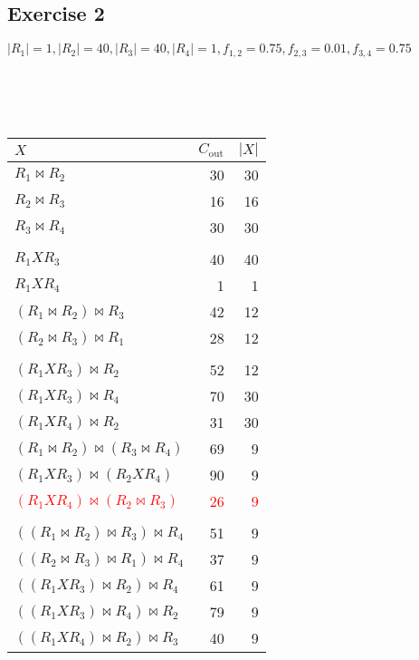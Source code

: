 \documentclass[11pt, a4]{article}
\begin{document}
\subsection*{Exercise 2}
$|R_1| = 1, |R_2| = 40, |R_3| = 40, |R_4| = 1, f_{1,2} = 0.75, f_{2,3} = 0.01, f_{3,4} = 0.75$\\
\vspace{.2cm}\\
\\
\vspace{.2cm}\\
\begin{tabular}{l|r|r}
    $X$ & $C_{\text{out}}$ & $|X|$\\
    \hline
    $R_1 \bowtie R_2$ & 30 & 30\\
    $R_2 \bowtie R_3$ & 16 & 16\\
    $R_3 \bowtie R_4$ & 30 & 30\\
    &&\\
    $R_1 X R_3$ & 40 & 40\\
    $R_1 X R_4$ & 1 & 1\\
    \hline
    $(R_1 \bowtie R_2)\bowtie R_3$ & 42 & 12\\
    $(R_2\bowtie R_3) \bowtie R_1$ & 28 & 12\\
    &&\\
    $(R_1 X R_3)\bowtie R_2$ & 52 & 12\\
    $(R_1 X R_3)\bowtie R_4$ & 70 & 30\\
    $(R_1 X R_4)\bowtie R_2$ & 31 & 30\\
    \hline
    $(R_1 \bowtie R_2)\bowtie (R_3 \bowtie R_4)$ & 69 & 9\\
    $(R_1 X R_3)\bowtie (R_2 X R_4)$ & 90 & 9\\
    \textcolor{red}{$(R_1 X R_4)\bowtie (R_2 \bowtie R_3)$} & \textcolor{red}{26} & \textcolor{red}{9}\\
    &&\\
    $((R_1 \bowtie R_2)\bowtie R_3) \bowtie R_4$ & 51 & 9\\
    $((R_2 \bowtie R_3)\bowtie R_1) \bowtie R_4$ & 37 & 9\\
    $((R_1 X R_3)\bowtie R_2) \bowtie R_4$ & 61 & 9\\
    $((R_1 X R_3)\bowtie R_4) \bowtie R_2$ & 79 & 9\\
    $((R_1 X R_4)\bowtie R_2) \bowtie R_3$ & 40 & 9\\
\end{tabular}
\end{document}
